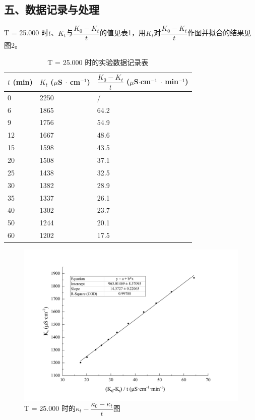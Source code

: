 \documentclass[a4paper]{ctexart}
\begin{document}
	\subsection*{五、数据记录与处理}
		T = 25.000 \textcelsius 时$t$、$K_t$与$\dfrac{K_0-K_t}{t}$的值见表1，用$K_t$对$\dfrac{K_0-K_t}{t}$作图并拟合的结果见图2。\par
		\begin{table}[htb]
			\caption{T = 25.000 \textcelsius 时的实验数据记录表}
			\begin{center}
				\begin{tabular}{p{6em}p{12em}p{16em}}
				\toprule
				$t$ (min) & $K_t$ ($\mu$S $\cdot$ cm$^{-1}$)
				& $\dfrac{K_0-K_t}{t}$ ($\mu$S$\cdot$cm$^{-1}$ $\cdot$ min$^{-1}$) \\
				\midrule
				0 & 2250 & / \\
				6 & 1865 & 64.2 \\
				9 & 1756 & 54.9 \\
				12 & 1667 & 48.6 \\
				15 & 1598 & 43.5 \\
				20 & 1508 & 37.1 \\
				25 & 1438 & 32.5 \\
				30 & 1382 & 28.9 \\
				35 & 1337 & 26.1 \\
				40 & 1302 & 23.7 \\
				50 & 1244 & 20.1 \\
				60 & 1202 & 17.5 \\ 
				\bottomrule
				\end{tabular}
			\end{center}
			\label{default}
		\end{table}
		\begin{figure}[htb]
			\begin{center}
			\includegraphics[width=36em]{T=25.pdf}
			\caption{T = 25.000 \textcelsius 时的$\kappa_t-\dfrac{\kappa_0-\kappa_t}{t}$图}
			\label{}
			\end{center}
		\end{figure}
\end{document}
